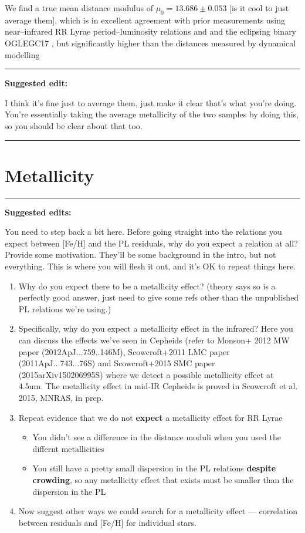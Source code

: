 \documentclass[a4paper,fleqn,usenatbib]{mnras}
\begin{document}
We find a true mean distance modulus of $\mu_0 = 13.686 \pm 0.053$ [is it cool to just average them], which is in excellent agreement with prior measurements using near--infrared RR Lyrae period--luminosity relations \citep{2006ApJ...652..362D} and and the eclipsing binary OGLEGC17 \citep{2001AJ....121.3089T}, but significantly higher than the distances measured by dynamical modelling \citep{2006A&A...445..513V,
2013MNRAS.436.2598W}

\noindent\rule[0.5ex]{\linewidth}{1pt}
{\bf Suggested edit:} 

I think it's fine just to average them, just make it clear that's what you're doing. You're essentially taking the average metallicity of the two samples by doing this, so you should be clear about that too.

\noindent\rule[0.5ex]{\linewidth}{1pt}

\section{Metallicity}
\label{sec:metallicity}

\noindent\rule[0.5ex]{\linewidth}{1pt}
{\bf Suggested edits:}

You need to step back a bit here. Before going straight into the relations you expect between [Fe/H] and the PL residuals, why do you expect a relation at all? Provide some motivation. They'll be some background in the intro, but not everything. This is where you will flesh it out, and it's OK to repeat things here. 

\begin{enumerate}
\item Why do you expect there to be a metallicity effect? (theory says so is a perfectly good answer, just need to give some refs other than the unpublished PL relations we're using.)
\item Specifically, why do you expect a metallicity effect in the infrared? Here you can discuss the effects we've seen in Cepheids (refer to Monson+ 2012 MW paper (2012ApJ...759..146M), Scowcroft+2011 LMC paper (2011ApJ...743...76S) and Scowcroft+2015 SMC paper (2015arXiv150206995S) where we detect a possible metallicity effect at 4.5um. The metallicity effect in mid-IR Cepheids is proved in Scowcroft et al. 2015, MNRAS, in prep. 
\item Repeat evidence that we do not {\bf expect} a metallicity effect for RR Lyrae 
\begin{itemize}
\item You didn't see a difference in the distance moduli when you used the differnt metallicities
\item You still have a pretty small dispersion in the PL relations {\bf despite crowding}, so any metallicity effect that exists must be smaller than the dispersion in the PL
\end{itemize}
\item Now suggest other ways we could search for a metallicity effect --- correlation between residuals and [Fe/H] for individual stars.
\end{enumerate}
\end{document}
